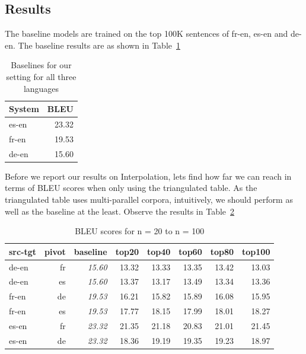 \subsection{Results}
	The baseline models are trained on the top 100K sentences of fr-en, es-en and de-en. The baseline results are as shown in Table~\ref{table:eparlbaselines}
\begin{table}
	\begin{tabular}{lr}

	\toprule
	System & BLEU \\
	\toprule
	es-en & 23.32 \\
	fr-en & 19.53 \\
	de-en & 15.60 \\
	\bottomrule
	\end{tabular}
	\centering
	\small
	\caption{Baselines for our setting for all three languages}
	\label{table:eparlbaselines}
\end{table}

	Before we report our results on Interpolation, lets find how far we can reach in terms of BLEU scores when only using the triangulated table. As the triangulated table uses multi-parallel corpora, intuitively, we should perform as well as the baseline at the least. Observe the results in Table~\ref{table:eparltopn}

	\begin{table}
	\begin{tabular}{lrrrrrrr}
		\toprule
		src-tgt & pivot & baseline & top20 & top40 & top60 & top80 & top100 \\
		\toprule
		de-en & fr & \emph{15.60} & 13.32 & 13.33 & 13.35 & 13.42 & 13.03 \\
		de-en & es & \emph{15.60} & 13.37 & 13.17 & 13.49 & 13.34 & 13.36 \\
		fr-en & de & \emph{19.53} & 16.21 & 15.82 & 15.89 & 16.08 & 15.95 \\
		fr-en & es & \emph{19.53} & 17.77 & 18.15 & 17.99 & 18.01 & 18.27 \\
		es-en & fr & \emph{23.32} & 21.35 & 21.18 & 20.83 & 21.01 & 21.45\\
		es-en & de & \emph{23.32} & 18.36 & 19.19 & 19.35 & 19.23 & 18.97 \\
		\bottomrule
		\end{tabular}
		\centering 
		\small
		\caption{BLEU scores for n = 20 to n = 100}
		\label{table:eparltopn}
	\end{table}

